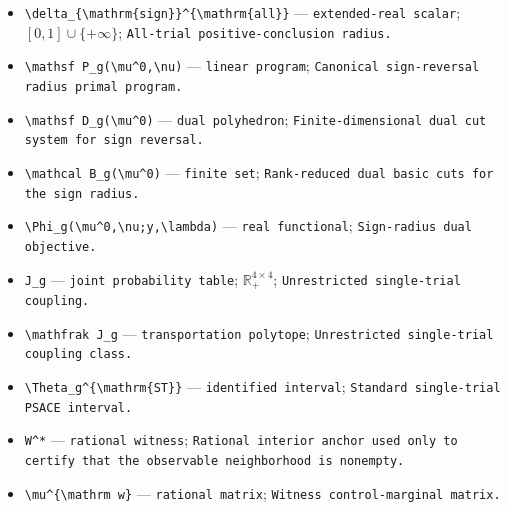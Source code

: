 \documentclass{article}
\begin{document}
\begin{itemize}
  \item \texttt{\textbackslash{}\allowbreak{}delta\_\allowbreak{}\{\textbackslash{}\allowbreak{}mathrm\{sign\}\allowbreak{}\}\allowbreak{}\textasciicircum{}\{\textbackslash{}\allowbreak{}mathrm\{all\}\allowbreak{}\}\allowbreak{}} --- \texttt{extended-\allowbreak{}real scalar}; \([0,1]\cup\{+\infty\}\); \texttt{All-\allowbreak{}trial positive-\allowbreak{}conclusion radius.}
  \item \texttt{\textbackslash{}\allowbreak{}mathsf P\_\allowbreak{}g(\textbackslash{}\allowbreak{}mu\textasciicircum{}0,\allowbreak{}\textbackslash{}\allowbreak{}nu)} --- \texttt{linear program}; \texttt{Canonical sign-\allowbreak{}reversal radius primal program.}
  \item \texttt{\textbackslash{}\allowbreak{}mathsf D\_\allowbreak{}g(\textbackslash{}\allowbreak{}mu\textasciicircum{}0)} --- \texttt{dual polyhedron}; \texttt{Finite-\allowbreak{}dimensional dual cut system for sign reversal.}
  \item \texttt{\textbackslash{}\allowbreak{}mathcal B\_\allowbreak{}g(\textbackslash{}\allowbreak{}mu\textasciicircum{}0)} --- \texttt{finite set}; \texttt{Rank-\allowbreak{}reduced dual basic cuts for the sign radius.}
  \item \texttt{\textbackslash{}\allowbreak{}Phi\_\allowbreak{}g(\textbackslash{}\allowbreak{}mu\textasciicircum{}0,\allowbreak{}\textbackslash{}\allowbreak{}nu;\allowbreak{}y,\allowbreak{}\textbackslash{}\allowbreak{}lambda)} --- \texttt{real functional}; \texttt{Sign-\allowbreak{}radius dual objective.}
  \item \texttt{J\_\allowbreak{}g} --- \texttt{joint probability table}; \(\mathbb R_+^{4\times4}\); \texttt{Unrestricted single-\allowbreak{}trial coupling.}
  \item \texttt{\textbackslash{}\allowbreak{}mathfrak J\_\allowbreak{}g} --- \texttt{transportation polytope}; \texttt{Unrestricted single-\allowbreak{}trial coupling class.}
  \item \texttt{\textbackslash{}\allowbreak{}Theta\_\allowbreak{}g\textasciicircum{}\{\textbackslash{}\allowbreak{}mathrm\{ST\}\allowbreak{}\}\allowbreak{}} --- \texttt{identified interval}; \texttt{Standard single-\allowbreak{}trial PSACE interval.}
  \item \texttt{W\textasciicircum{}*} --- \texttt{rational witness}; \texttt{Rational interior anchor used only to certify that the observable neighborhood is nonempty.}
  \item \texttt{\textbackslash{}\allowbreak{}mu\textasciicircum{}\{\textbackslash{}\allowbreak{}mathrm w\}\allowbreak{}} --- \texttt{rational matrix}; \texttt{Witness control-\allowbreak{}marginal matrix.}

\end{itemize}
\end{document}
